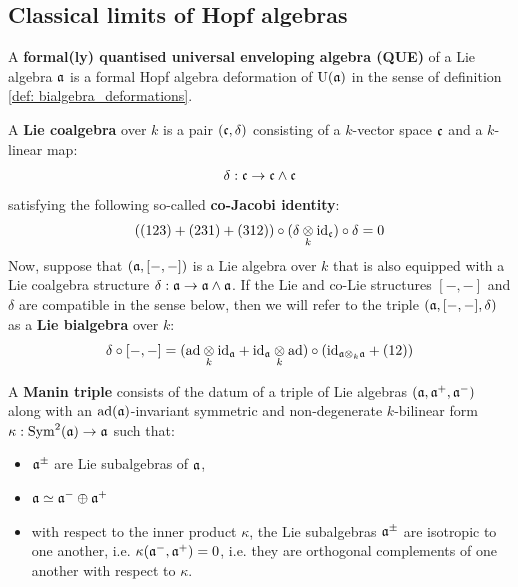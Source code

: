     \subsection{Classical limits of Hopf algebras}
        \begin{definition} \label{def: formal_QUEs}
            A \textbf{formal(ly) quantised universal enveloping algebra (QUE)} of a Lie algebra $\mathfrak{a}$ is a formal Hopf algebra deformation of $\mathrm{U}(\mathfrak{a})$ in the sense of definition \ref{def: bialgebra_deformations}.
        \end{definition}
    
        \begin{definition} \label{def: lie_co/bialgebras}
            A \textbf{Lie coalgebra} over $k$ is a pair $(\mathfrak{c}, \delta)$ consisting of a $k$-vector space $\mathfrak{c}$ and a $k$-linear map:
                $$\delta: \mathfrak{c} \to \mathfrak{c} \wedge \mathfrak{c}$$
            satisfying the following so-called \textbf{co-Jacobi identity}:
                $$((123) + (231) + (312)) \circ (\delta \tensor_k \id_\c) \circ \delta = 0$$
            Now, suppose that $(\mathfrak{a}, [-, -])$ is a Lie algebra over $k$ that is also equipped with a Lie coalgebra structure $\delta: \mathfrak{a} \to \mathfrak{a} \wedge \mathfrak{a}$. If the Lie and co-Lie structures $[-, -]$ and $\delta$ are compatible in the sense below, then we will refer to the triple $(\mathfrak{a}, [-, -], \delta)$ as a \textbf{Lie bialgebra} over $k$:
                $$\delta \circ [-, -] = (\ad \tensor_k \id_{\a} + \id_{\a} \tensor_k \ad) \circ (\id_{\a \tensor_k \a} + (12))$$
        \end{definition}
        \begin{definition} \label{def: manin_triples}
            A \textbf{Manin triple} consists of the datum of a triple of Lie algebras $(\mathfrak{a}, \mathfrak{a}^+, \mathfrak{a}^-)$ along with an $\mathrm{ad}(\mathfrak{a})$-invariant symmetric and non-degenerate $k$-bilinear form $\kappa: \operatorname{Sym}^2(\mathfrak{a}) \to \mathfrak{a}$ such that:
                \begin{itemize}
                    \item $\mathfrak{a}^{\pm}$ are Lie subalgebras of $\mathfrak{a}$,
                    \item $\mathfrak{a} \simeq \mathfrak{a}^- \oplus \mathfrak{a}^+$
                    \item with respect to the inner product $\kappa$, the Lie subalgebras $\mathfrak{a}^{\pm}$ are isotropic to one another, i.e. $\kappa(\mathfrak{a}^-, \mathfrak{a}^+) = 0$, i.e. they are orthogonal complements of one another with respect to $\kappa$.
                \end{itemize}
        \end{definition}
